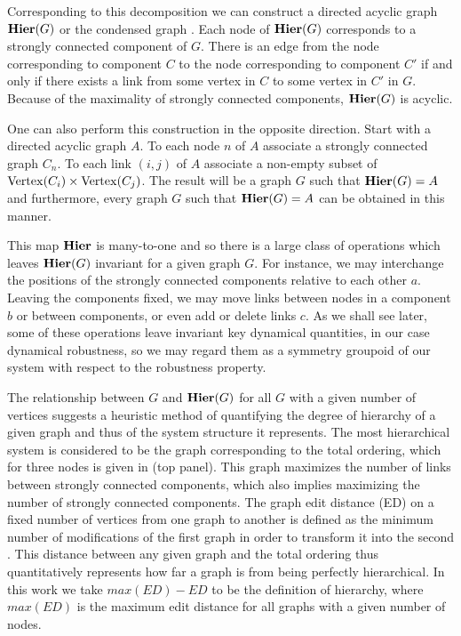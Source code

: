 Corresponding to this decomposition we can construct a directed acyclic graph $\mathbf{Hier} (G)$ or the condensed graph \cite{Corominas-Murtra2013}.  Each node of $\mathbf{Hier} (G)$ corresponds to a strongly connected component of $G$. There is an edge from the node corresponding to component $C$ to the node corresponding to component $C'$ if and only if there exists a link from some vertex in $C$ to some vertex in $C'$ in $G$.  Because of the maximality of strongly connected components, $\mathbf{Hier} (G)$ is acyclic.

One can also perform this construction in the opposite direction.  Start with a directed acyclic graph $A$.  To each node $n$ of $A$ associate
a strongly connected graph $C_n$.  To each link $(i,j)$ of $A$ associate a non-empty subset of $\mathrm{Vertex}(C_i) \times \mathrm{Vertex}(C_j)$.  The result will be a graph $G$ such that $\mathbf{Hier}(G) = A$ and furthermore, every graph $G$ such that $\mathbf{Hier}(G) = A$ can be obtained in this manner.

This map $\mathbf{Hier}$ is many-to-one and so there is a large class of
operations which leaves $\mathbf{Hier}(G)$ invariant for a given graph $G$.
For instance, we may interchange the positions of the strongly
connected components relative to each other $a$.  Leaving the components fixed, we may move links between nodes in a component $b$ or between components, or even add or delete links $c$.  As we shall see later, some of these operations leave invariant key dynamical quantities, in our case dynamical robustness, so we may regard them as a symmetry groupoid of our system with respect to the robustness property.

The relationship between $G$ and $\mathbf{Hier}(G)$ for all $G$ with a given number of vertices suggests a heuristic method of quantifying the degree of hierarchy of a given graph and thus of the system structure it represents. The most hierarchical system is considered to be the graph corresponding to the total ordering, which for three nodes is given in  (top panel). This graph maximizes the number of links between strongly connected components, which also implies maximizing the number of strongly connected components. The graph edit distance (ED) on a fixed number of vertices from one graph to another is defined as the minimum number of modifications of the first graph in order to transform it into the second \cite{Axenovich2011}. This distance between any given graph and the total ordering thus quantitatively represents how far a graph is from being perfectly hierarchical. In this work we take $max(ED) - ED$ to be the definition of hierarchy, where $max(ED)$ is the maximum edit distance for all graphs with a given number of nodes.

